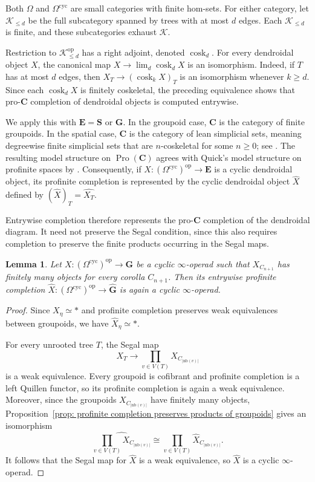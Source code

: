 \documentclass{amsart}
\newcommand{\bC}{\mathbf{C}}
\newcommand{\bE}{\mathbf{E}}
\newcommand{\sSet}{\mathbf{S}}
\newcommand{\Grpd}{\mathbf{G}}
\newcommand{\Pro}{\operatorname{Pro}}
\newtheorem{lemma}[theorem]{Lemma}%
\theoremstyle{definition}
\numberwithin{equation}{section}
\begin{document}
Both $\Omega$ and $\Omega^{\mathrm{cyc}}$ are small categories with
finite hom-sets. For either category, let $\mathscr K_{\leq d}$ be
the full subcategory spanned by trees with at most $d$ edges. Each
$\mathscr K_{\leq d}$ is finite, and these subcategories exhaust
$\mathscr K$.

Restriction to $\mathscr K_{\leq d}^{\mathrm{op}}$ has a right
adjoint, denoted $\operatorname{cosk}_d$. For every dendroidal object
$X$, the canonical map
$X\to\lim_d\operatorname{cosk}_dX$ is an isomorphism. Indeed, if $T$
has at most $d$ edges, then
$X_T\to(\operatorname{cosk}_kX)_T$ is an isomorphism whenever
$k\geq d$. Since each $\operatorname{cosk}_dX$ is finitely
coskeletal, the preceding equivalence shows that pro-$\bC$
completion of dendroidal objects is computed entrywise.

We apply this with $\bE=\sSet$ or $\Grpd$. In the groupoid case,
$\bC$ is the category of finite groupoids. In the spatial case,
$\bC$ is the category of lean simplicial sets, meaning degreewise
finite simplicial sets that are $n$-coskeletal for some $n\geq0$;
see \cite[Section~2]{BM20}. The resulting model structure on
$\Pro(\bC)$ agrees with Quick's model structure on profinite spaces
by \cite[Example~5.5 and Corollary~6.6]{BM20}. Consequently, if
$X\colon(\Omega^{\mathrm{cyc}})^{\mathrm{op}}\to\bE$ is a cyclic
dendroidal object, its profinite completion is represented by the
cyclic dendroidal object $\widehat X$ defined by
$(\widehat X)_T=\widehat{X_T}$.

Entrywise completion therefore represents the pro-$\bC$ completion
of the dendroidal diagram. It need not preserve the Segal condition,
since this also requires completion to preserve the finite products
occurring in the Segal maps.

\begin{lemma}
\label{lem: profinite completion of cyclic infinity operads}
Let
$X\colon(\Omega^{\mathrm{cyc}})^{\mathrm{op}}\to\Grpd$
be a cyclic $\infty$-operad such that $X_{C_{n+1}}$ has finitely many
objects for every corolla $C_{n+1}$. Then its entrywise profinite
completion
$\widehat X\colon(\Omega^{\mathrm{cyc}})^{\mathrm{op}}
\to\widehat{\Grpd}$
is again a cyclic $\infty$-operad.
\end{lemma}

\begin{proof}
Since $X_\eta\simeq *$ and profinite completion preserves weak
equivalences between groupoids, we have $\widehat X_\eta\simeq *$.

For every unrooted tree $T$, the Segal map
\[
X_T\longrightarrow
\prod_{v\in V(T)}X_{C_{|\mathrm{nb}(v)|}}
\]
is a weak equivalence. Every groupoid is cofibrant and profinite
completion is a left Quillen functor, so its profinite completion is
again a weak equivalence. Moreover, since the groupoids
$X_{C_{|\mathrm{nb}(v)|}}$ have finitely many objects,
Proposition~\ref{prop: profinite completion preserves products of groupoids}
gives an isomorphism
\[
\widehat{\prod_{v\in V(T)}X_{C_{|\mathrm{nb}(v)|}}}
\cong
\prod_{v\in V(T)}
\widehat X_{C_{|\mathrm{nb}(v)|}}.
\]
It follows that the Segal map for $\widehat X$ is a weak equivalence,
so $\widehat X$ is a cyclic $\infty$-operad.
\end{proof}
\end{document}
